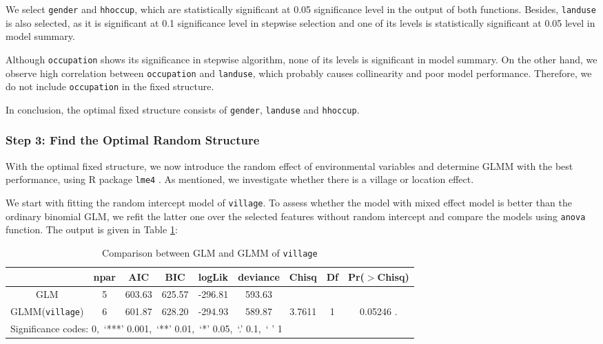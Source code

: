 \documentclass[11pt,twoside]{article}
\numberwithin{Theorem}{section}
\numberwithin{Definition}{section}
\numberwithin{Lemma}{section}
\numberwithin{Algorithm}{section}
\numberwithin{equation}{section}
\begin{document}
We select \texttt{gender} and \texttt{hhoccup}, which are statistically significant at 0.05 significance level in the output of both functions. Besides, \texttt{landuse} is also selected, as it is significant at 0.1 significance level in stepwise selection and one of its levels is statistically significant at 0.05 level in model summary.  

Although \texttt{occupation} shows its significance in stepwise algorithm, none of its levels is significant in model summary. On the other hand, we observe high correlation between \texttt{occupation} and \texttt{landuse}, which probably causes collinearity and poor model performance. Therefore, we do not include \texttt{occupation} in the fixed structure.

In conclusion, the optimal fixed structure consists of \texttt{gender}, \texttt{landuse} and \texttt{hhoccup}.

\subsubsection{Step 3: Find the Optimal Random Structure}

With the optimal fixed structure, we now introduce the random effect of environmental variables and determine GLMM with the best performance, using R package \texttt{lme4} \cite{lme4}. As mentioned, we investigate whether there is a village or location effect. 

We start with fitting the random intercept model of \texttt{village}. To assess whether the model with mixed effect model is better than the ordinary binomial GLM, we refit the latter one over the selected features without random intercept and compare the models using \texttt{anova} function. The output is given in Table \ref{tab:glmm1}:

\begin{table}[!h]
	\centering
	\begin{tabular}{|c|c|c|c|c|c|c|c|c|}
		\hline
		 & npar & AIC & BIC & logLik & deviance & Chisq & Df & Pr($>$Chisq) \\  
		 \hline
		GLM & 5 & 603.63 & 625.57 & -296.81 & 593.63 & & & \\                      
		GLMM(\texttt{village}) & 6 & 601.87 & 628.20 & -294.93 & 589.87 & 3.7611 & 1 & 0.05246 . \\
		\hline
		\multicolumn{9}{|l|}{Significance codes: 0,\ ‘***’ 0.001,\ ‘**’ 0.01,\ ‘*’ 0.05,\ ‘.’ 0.1,\ ‘ ’ 1} \\
		\hline
	\end{tabular}
	\caption{Comparison between GLM and GLMM of \texttt{village}}
	\label{tab:glmm1}
\end{table}
\end{document}
